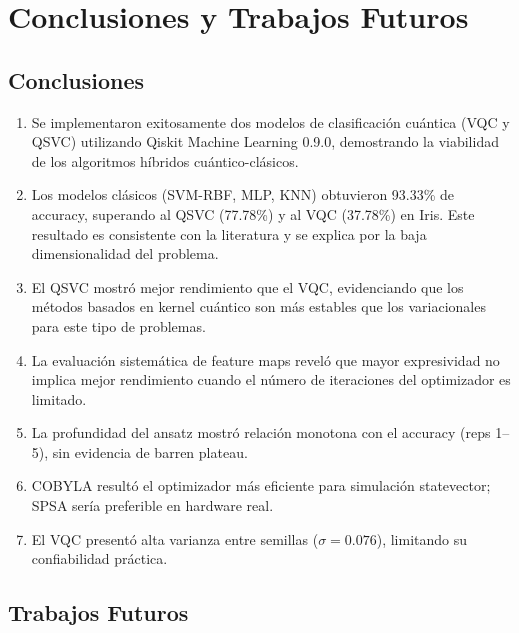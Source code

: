 \section{Conclusiones y Trabajos Futuros}

\subsection{Conclusiones}

\begin{enumerate}
    \item Se implementaron exitosamente dos modelos de clasificaci\'on cu\'antica (VQC y QSVC) utilizando Qiskit Machine Learning 0.9.0, demostrando la viabilidad de los algoritmos h\'ibridos cu\'antico-cl\'asicos.

    \item Los modelos cl\'asicos (SVM-RBF, MLP, KNN) obtuvieron 93.33\% de accuracy, superando al QSVC (77.78\%) y al VQC (37.78\%) en Iris. Este resultado es consistente con la literatura y se explica por la baja dimensionalidad del problema.

    \item El QSVC mostr\'o mejor rendimiento que el VQC, evidenciando que los m\'etodos basados en kernel cu\'antico son m\'as estables que los variacionales para este tipo de problemas.

    \item La evaluaci\'on sistem\'atica de feature maps revel\'o que mayor expresividad no implica mejor rendimiento cuando el n\'umero de iteraciones del optimizador es limitado.

    \item La profundidad del ansatz mostr\'o relaci\'on monotona con el accuracy (reps 1--5), sin evidencia de barren plateau.

    \item COBYLA result\'o el optimizador m\'as eficiente para simulaci\'on statevector; SPSA ser\'ia preferible en hardware real.

    \item El VQC present\'o alta varianza entre semillas ($\sigma = 0.076$), limitando su confiabilidad pr\'actica.
\end{enumerate}

\subsection{Trabajos Futuros}

